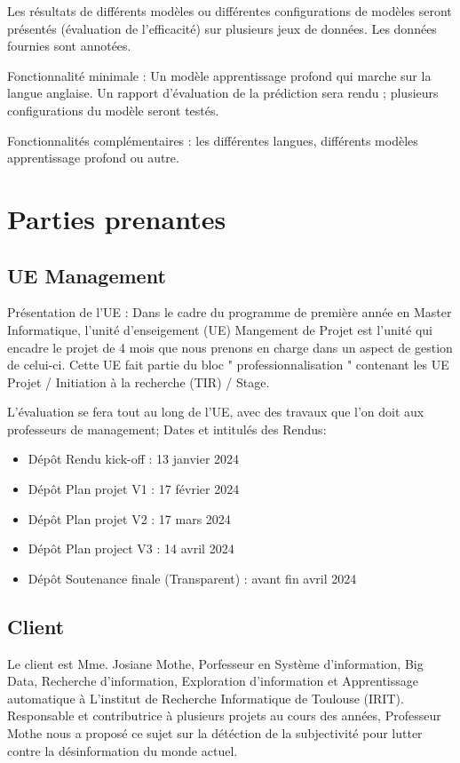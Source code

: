 \documentclass[11pt]{rapport_class}
\begin{document}
Les résultats de différents modèles ou différentes configurations de modèles seront présentés
(évaluation de l’efficacité) sur plusieurs jeux de données. Les données fournies sont annotées.

Fonctionnalité minimale : Un modèle apprentissage profond qui marche sur la langue anglaise. Un rapport d’évaluation de la prédiction sera rendu ; plusieurs configurations du modèle seront testés.

Fonctionnalités complémentaires : les différentes langues, différents modèles apprentissage profond ou autre.

\section{Parties prenantes}
\subsection{UE Management}
Présentation de l'UE : Dans le cadre du programme de première année en Master Informatique, l'unité d'enseigement (UE) Mangement de Projet est l'unité qui encadre le projet de 4 mois que nous prenons en charge dans un aspect de gestion de celui-ci. Cette UE fait partie du bloc " professionnalisation " contenant les UE Projet / Initiation à la recherche (TIR) / Stage.

L'évaluation se fera tout au long de l'UE, avec des travaux que l'on doit aux professeurs de management;
Dates et intitulés des Rendus:
\begin{itemize}
    \item Dépôt Rendu kick-off  : 13 janvier 2024
    \item Dépôt Plan projet V1  : 17 février 2024
    \item Dépôt Plan projet V2  : 17 mars 2024
    \item Dépôt Plan project V3 : 14 avril 2024
    \item Dépôt Soutenance finale (Transparent) : avant fin avril 2024
\end{itemize}


\subsection{Client}
Le client est Mme. Josiane Mothe, Porfesseur en Système d'information, Big Data, Recherche d'information, Exploration d'information et Apprentissage automatique à L'institut de Recherche Informatique de Toulouse (IRIT). Responsable et contributrice à plusieurs projets au cours des années, Professeur Mothe nous a proposé ce sujet sur la détéction de la subjectivité pour lutter contre la désinformation du monde actuel.
\end{document}
